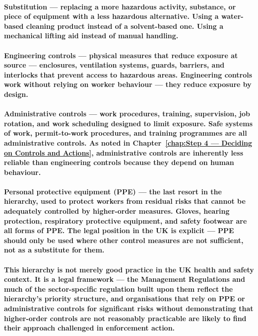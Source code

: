 \paragraph{\textbf{Substitution} — replacing a more hazardous activity, substance, or piece of equipment with a less hazardous alternative. Using a water-based cleaning product instead of a solvent-based one. Using a mechanical lifting aid instead of manual handling.}
\paragraph{\textbf{Engineering controls} — physical measures that reduce exposure at source — enclosures, ventilation systems, guards, barriers, and interlocks that prevent access to hazardous areas. Engineering controls work without relying on worker behaviour — they reduce exposure by design.}
\paragraph{\textbf{Administrative controls} — work procedures, training, supervision, job rotation, and work scheduling designed to limit exposure. Safe systems of work, permit-to-work procedures, and training programmes are all administrative controls. As noted in Chapter~\ref{chap:Step 4 — Deciding on Controls and Actions}, administrative controls are inherently less reliable than engineering controls because they depend on human behaviour.}
\paragraph{\textbf{Personal protective equipment (PPE)} — the last resort in the hierarchy, used to protect workers from residual risks that cannot be adequately controlled by higher-order measures. Gloves, hearing protection, respiratory protective equipment, and safety footwear are all forms of PPE. The legal position in the UK is explicit — PPE should only be used where other control measures are not sufficient, not as a substitute for them.}
\paragraph{This hierarchy is not merely good practice in the UK health and safety context. It is a legal framework — the \textbf{Management Regulations} and much of the sector-specific regulation built upon them reflect the hierarchy's priority structure, and organisations that rely on PPE or administrative controls for significant risks without demonstrating that higher-order controls are not reasonably practicable are likely to find their approach challenged in enforcement action.}

